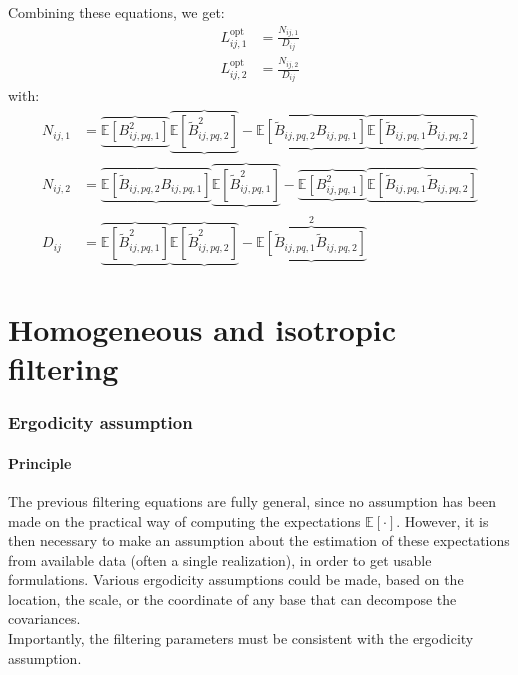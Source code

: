\documentclass[12pt]{scrartcl}
\begin{document}
Combining these equations, we get:
\begin{subequations}
\label{eq:de_th_com}
\begin{align}
L_{ij,1}^\mathrm{opt} & = \frac{N_{ij,1}}{D_{ij}}\\
L_{ij,2}^\mathrm{opt} & = \frac{N_{ij,2}}{D_{ij}}
\end{align}
\end{subequations}
with:
\begin{subequations}
\begin{align}
N_{ij,1} & = \underbrace{\overbrace{\mathbb{E} \left[B^2_{ij,pq,1}\right]}} \underbrace{\overbrace{\mathbb{E} \left[\widetilde{B}_{ij,pq,2}^2\right]}} - \underbrace{\overbrace{\mathbb{E} \left[\widetilde{B}_{ij,pq,2} B_{ij,pq,1}\right]}} \underbrace{\overbrace{\mathbb{E} \left[\widetilde{B}_{ij,pq,1} \widetilde{B}_{ij,pq,2}\right]}} \\
N_{ij,2} & = \underbrace{\overbrace{\mathbb{E} \left[\widetilde{B}_{ij,pq,2} B_{ij,pq,1}\right]}} \underbrace{\overbrace{\mathbb{E} \left[\widetilde{B}_{ij,pq,1}^2\right]}} - \underbrace{\overbrace{\mathbb{E} \left[B^2_{ij,pq,1}\right]}} \underbrace{\overbrace{\mathbb{E} \left[\widetilde{B}_{ij,pq,1} \widetilde{B}_{ij,pq,2}\right]}} \\
D_{ij} & = \underbrace{\overbrace{\mathbb{E} \left[\widetilde{B}_{ij,pq,1}^2\right]}} \underbrace{\overbrace{\mathbb{E} \left[\widetilde{B}_{ij,pq,2}^2\right]}} - {\underbrace{\overbrace{\mathbb{E} \left[\widetilde{B}_{ij,pq,1} \widetilde{B}_{ij,pq,2}\right]}}}^2
\end{align}
\end{subequations}

\clearpage

\part{Homogeneous and isotropic filtering}

\section{Ergodicity assumption}

\subsection{Principle}
The previous filtering equations are fully general, since no assumption has been made on the practical way of computing the expectations $\mathbb{E}\left[\cdot\right]$. However, it is then necessary to make an assumption about the estimation of these expectations from available data (often a single realization), in order to get usable formulations. Various ergodicity assumptions could be made, based on the location, the scale, or the coordinate of any base that can decompose the covariances.\\
$  $\\
Importantly, the filtering parameters must be consistent with the ergodicity assumption. 
\end{document}
